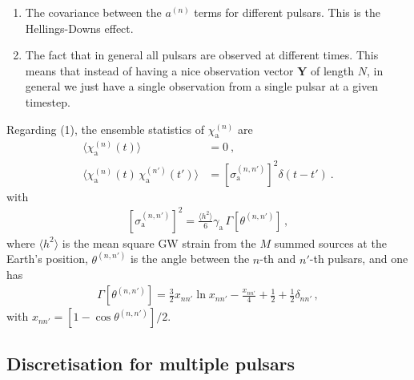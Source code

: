 \documentclass{tufte-handout} %
\begin{document}
\begin{enumerate}
	\item The covariance between the $a^{(n)}$ terms for different pulsars. This is the Hellings-Downs effect.
	\item The fact that in general all pulsars are observed at different times. This means that instead of having a nice observation vector $\mathbf{Y}$ of length $N$, in general we just have a single observation from a single pulsar at a given timestep. 
\end{enumerate}


\noindent Regarding (1), the ensemble statistics of $\chi_{\mathrm a}^{(n)}$ are
\begin{align}
	\langle \chi^{(n)}_{\mathrm a}(t) \rangle &= 0 \ , 	\label{eq:xieqn1} \\
	\langle \chi^{(n)}_{\mathrm a}(t) \, \chi^{(n')}_{\mathrm a}(t') \rangle &= \left[\sigma^{(n,n')}_{\mathrm a}\right]^2 \delta(t - t') \ .	\label{eq:xieqn2}
\end{align}
with
\begin{eqnarray}
	\left[\sigma^{(n,n')}_{\mathrm a}\right]^2 = \frac{\langle h^2\rangle}{6} \gamma_{\mathrm a} \, \Gamma \left[ \theta^{(n,n')} \right] \, , \label{eq:sigma_a_expression}
\end{eqnarray}
where $\langle h^2 \rangle$ is the mean square GW strain from the $M$ summed sources at the Earth's position, $\theta^{(n,n')}$ is the angle between the $n$-th and $n'$-th pulsars, and one has
\begin{eqnarray}
	\Gamma\left[\theta^{(n,n')} \right] =  \frac{3}{2} x_{n n'} \ln x_{n n'}  -\frac{x_{n n'} }{4}+\frac{1}{2} + \frac{1}{2} \delta_{n n'}\label{eq:correlation} \, ,
\end{eqnarray}
with $x_{nn'} = \left[1 - \cos \theta^{(n,n')}\right]/2$. 



\subsection{Discretisation for multiple pulsars}
	
\end{document}
